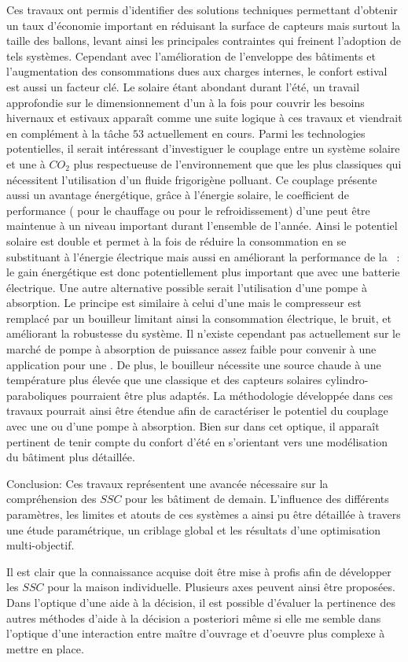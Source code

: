 Ces travaux ont permis d’identifier des solutions techniques permettant d’obtenir un taux
d’économie important en réduisant la surface de capteurs mais surtout la taille des
ballons, levant ainsi les principales contraintes qui freinent l’adoption de tels
systèmes. Cependant avec l’amélioration de l’enveloppe des bâtiments et l’augmentation des
consommations dues aux charges internes, le confort estival est aussi un facteur clé. Le
solaire étant abondant durant l’été, un travail approfondie sur le dimensionnement d’un
 à la fois pour couvrir les besoins hivernaux et estivaux apparaît comme une suite
logique à ces travaux et viendrait en complément à la tâche $53$ actuellement en cours.
Parmi les technologies potentielles, il serait intéressant d’investiguer le couplage entre
un système solaire et une  à $CO_{2}$ plus respectueuse de l’environnement que
que les  plus classiques qui nécessitent l’utilisation d’un fluide frigorigène
polluant. Ce couplage présente aussi un avantage énergétique, grâce à l’énergie solaire,
le coefficient de performance ( pour le chauffage ou  pour le
refroidissement) d’une  peut être maintenue à un niveau important durant
l’ensemble de l’année. Ainsi le potentiel solaire est double et permet à la fois de
réduire la consommation en se substituant à l’énergie électrique mais aussi en améliorant
la performance de la ~: le gain énergétique est donc potentiellement plus
important que avec une batterie électrique. Une autre alternative possible serait
l’utilisation d’une pompe à absorption. Le principe est similaire à celui d’une 
mais le compresseur est remplacé par un bouilleur limitant ainsi la consommation
électrique, le bruit, et améliorant la robustesse du système. Il n’existe cependant pas
actuellement sur le marché de pompe à absorption de puissance assez faible pour convenir à
une application pour une . De plus, le bouilleur nécessite une source chaude à
une température plus élevée que une  classique et des capteurs solaires
cylindro-paraboliques pourraient être plus adaptés. La méthodologie développée dans ces travaux
pourrait ainsi être étendue afin de caractériser le potentiel du couplage avec une
 ou d’une pompe à absorption. Bien sur dans cet optique, il apparaît pertinent de
tenir compte du confort d’été en s’orientant vers une modélisation du bâtiment plus
détaillée.



Conclusion:
Ces travaux représentent une avancée nécessaire sur la compréhension des $SSC$ pour
les bâtiment de demain. L’influence des différents paramètres, les limites et atouts
de ces systèmes a ainsi pu être détaillée à travers une étude paramétrique, un criblage
global et les résultats d’une optimisation multi-objectif.

Il est clair que la connaissance acquise doit être mise à profis afin de développer
les $SSC$ pour la maison individuelle. Plusieurs axes peuvent ainsi être proposées.
Dans l’optique d’une aide à la décision, il est possible d’évaluer la pertinence
des autres méthodes d’aide à la décision a posteriori même si elle me semble dans
l’optique d’une interaction entre maître d’ouvrage et d’oeuvre plus complexe à mettre
en place.

